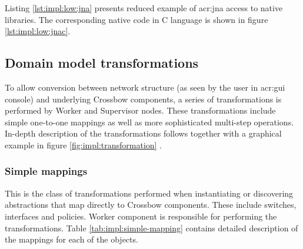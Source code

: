 \documentclass[11pt,openany]{book}
\begin{document}
        Listing \ref{lst:impl:low:jna} presents reduced example of \gls{acr:jna} access to native libraries. The
        corresponding native code in C language is shown in figure \ref{lst:impl:low:jnac}. \\


        \noindent
          \begin{minipage}{\textwidth}
          
        \end{minipage}  

        \noindent
        \begin{minipage}{\textwidth}
          
        \end{minipage}


      \subsection{Domain model transformations}
      \label{sec:impl:model}


        To allow conversion between network structure (as seen by the user in \gls{acr:gui} console) and underlying
        Crossbow components, a series of transformations is performed by Worker and Supervisor nodes. These
        transformations include simple one-to-one mappings as well as more sophisticated multi-step operations.
        In-depth description of the transformations follows together with a graphical example in figure
        \ref{fig:impl:transformation} .



        \subsubsection{Simple mappings}

          This is the class of transformations performed when instantiating or discovering abstractions that map
          directly to Crossbow components. These include switches, interfaces and policies. Worker component is
          responsible for performing the transformations. Table \ref{tab:impl:simple-mapping} contains detailed
          description of the mappings for each of the objects.
\end{document}
